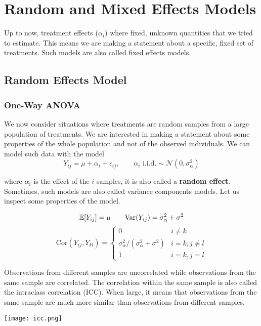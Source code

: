 \section{Random and Mixed Effects Models}

Up to now, treatment effects ($\alpha_i$) where fixed, unknown quantities that we tried to estimate. This means we are making a statement about a specific, fixed set of treatments. Such models are also called fixed effects models.

\subsection{Random Effects Model}

\subsubsection{One-Way ANOVA}

We now consider situations where treatments are random samples from a large population of treatments. We are interested in making a statement about some properties of the whole population and not of the observed individuals. We can model such data with the model
$$Y_{ij} = \mu + \alpha_i + \epsilon_{ij}, \qquad \alpha_i \text{ i.i.d.} \sim \mathcal{N}(0, \sigma_\alpha^2)$$

where $\alpha_i$ is the effect of the $i$ samples, it is also called a \textbf{random effect}. Sometimes, such models are also called variance components models. Let us inspect some properties of the model.

$$\mathbb{E} [Y_{ij}] = \mu \qquad \text{Var}(Y_{ij}) = \sigma_\alpha^2 + \sigma^2$$
$$\text{Cor}(Y_{ij}, Y_{kl}) = \begin{cases}
	0 & i \neq k \\
	\sigma_\alpha^2 / (\sigma_\alpha^2 + \sigma^2) & i = k, j \neq l \\
	1 & i = k, j = l
\end{cases}$$

Observations from different samples are uncorrelated while observations from the same sample are correlated. The correlation within the same sample is also called the intraclass correlation (ICC). When large, it means that observations from the same sample are much more similar than observations from different samples.

\begin{center}
	\texttt{[image: icc.png]}
\end{center}

